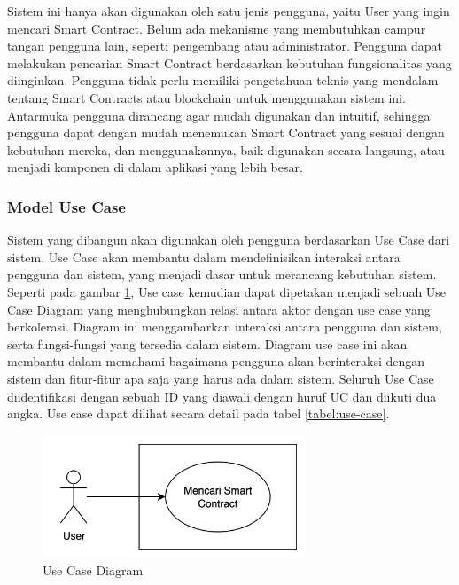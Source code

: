 Sistem ini hanya akan digunakan oleh satu jenis pengguna, yaitu User yang ingin mencari Smart Contract. Belum ada mekanisme yang membutuhkan campur tangan pengguna lain, seperti pengembang atau administrator. Pengguna dapat melakukan pencarian Smart Contract berdasarkan kebutuhan fungsionalitas yang diinginkan. Pengguna tidak perlu memiliki pengetahuan teknis yang mendalam tentang Smart Contracts atau blockchain untuk menggunakan sistem ini. Antarmuka pengguna dirancang agar mudah digunakan dan intuitif, sehingga pengguna dapat dengan mudah menemukan Smart Contract yang sesuai dengan kebutuhan mereka, dan menggunakannya, baik digunakan secara langsung, atau menjadi komponen di dalam aplikasi yang lebih besar.

\subsubsection{Model Use Case}

Sistem yang dibangun akan digunakan oleh pengguna berdasarkan Use Case dari sistem. Use Case akan membantu dalam mendefinisikan interaksi antara pengguna dan sistem, yang menjadi dasar untuk merancang kebutuhan sistem. Seperti pada gambar \ref{image:usecase}, Use case kemudian dapat dipetakan menjadi sebuah Use Case Diagram yang menghubungkan relasi antara aktor dengan use case yang berkolerasi. Diagram ini menggambarkan interaksi antara pengguna dan sistem, serta fungsi-fungsi yang tersedia dalam sistem. Diagram use case ini akan membantu dalam memahami bagaimana pengguna akan berinteraksi dengan sistem dan fitur-fitur apa saja yang harus ada dalam sistem. Seluruh Use Case diidentifikasi dengan sebuah ID yang diawali dengan huruf UC dan diikuti dua angka. Use case dapat dilihat secara detail pada tabel \ref{tabel:use-case}.

\begin{figure}[ht]
	\centering
	\includegraphics[width=0.7\textwidth]{resources/chapter-3/use-case.png}
	\caption{Use Case Diagram}
	\label{image:usecase}
\end{figure}

